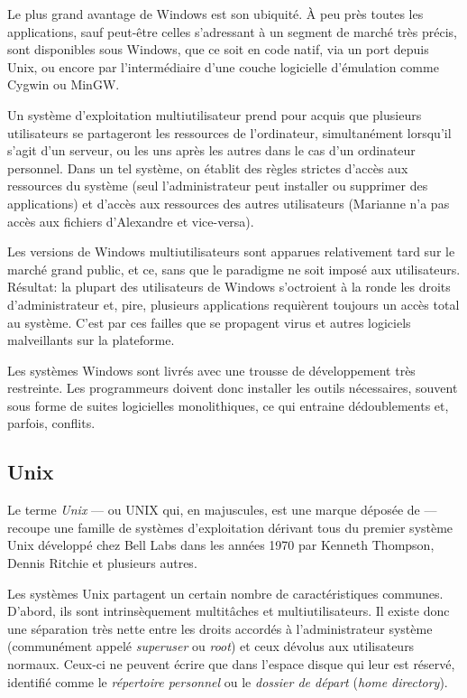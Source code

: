 Le plus grand avantage de Windows est son ubiquité. À
peu près toutes les applications, sauf peut-être celles s'adressant à
un segment de marché très précis, sont disponibles sous Windows, que
ce soit en code natif, via un port depuis Unix, ou encore
par l'intermédiaire d'une couche logicielle d'émulation comme Cygwin
ou MinGW.

Un système d'exploitation multiutilisateur prend pour acquis que
plusieurs utilisateurs se partageront les ressources de l'ordinateur,
simultanément lorsqu'il s'agit d'un serveur, ou les uns après les
autres dans le cas d'un ordinateur personnel. Dans un tel système, on
établit des règles strictes d'accès aux ressources du système (seul
l'administrateur peut installer ou supprimer des applications) et
d'accès aux ressources des autres utilisateurs (Marianne n'a pas
accès aux fichiers d'Alexandre et vice-versa).

Les versions de Windows multiutilisateurs sont apparues
relativement tard sur le marché grand public, et ce, sans que le
paradigme ne soit imposé aux utilisateurs. Résultat: la plupart des
utilisateurs de Windows s'octroient à la ronde les droits
d'administrateur et, pire, plusieurs applications requièrent toujours
un accès total au système. C'est par ces failles que se propagent
virus et autres logiciels malveillants sur la plateforme.

Les systèmes Windows sont livrés avec une trousse de
développement très restreinte. Les programmeurs doivent donc installer
les outils nécessaires, souvent sous forme de suites logicielles
monolithiques, ce qui entraine dédoublements et, parfois, conflits.

\subsection{Unix}
\label{sec:informatique:os:unix}

Le terme \emph{Unix} --- ou UNIX qui, en majuscules, est
une marque déposée de 
--- recoupe une famille de systèmes d'exploitation dérivant tous du
premier système Unix développé chez Bell Labs dans les années 1970 par
Kenneth Thompson, Dennis Ritchie et plusieurs autres.

Les systèmes Unix partagent un certain nombre de
caractéristiques communes. D'abord, ils sont intrinsèquement
multitâches et multiutilisateurs. Il existe donc une séparation très
nette entre les droits accordés à l'administrateur système
(communément appelé \emph{superuser} ou \emph{root}) et ceux dévolus
aux utilisateurs normaux. Ceux-ci ne peuvent écrire que dans l'espace
disque qui leur est réservé, identifié comme le %
\emph{répertoire
  personnel} ou le %
\emph{dossier de
  départ} (\emph{home directory}).

